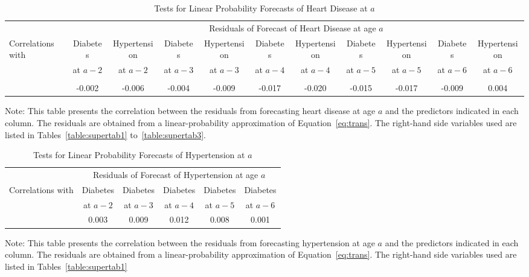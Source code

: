 \begin{landscape}
\begin{table}[H]
\begin{threeparttable}
\caption{Tests for Linear Probability Forecasts of Heart Disease at $a$} \label{table:1storderresidsheart}
\scriptsize
\centering
\begin{tabular}{lcccccccccc} \toprule
& \multicolumn{10}{c}{Residuals of Forecast of Heart Disease at age $a$} \\
Correlations with	&	Diabetes &	Hypertension &	Diabetes &	Hypertension &	Diabetes	&	Hypertension &	Diabetes & Hypertension & Diabetes & Hypertension \\
                    &	at $a - 2$ &	at $a - 2$		&	at $a - 3$ & at $a - 3$		& at $a - 4$		& at $a - 4$		& at $a - 5$	& at $a - 5$	& at $a - 6$	& at $a - 6$	\\

\midrule \\
&	-0.002	&	-0.006	&	-0.004	& -0.009 &	-0.017	& -0.020	&	-0.015	&	-0.017 &-0.009	&	0.004	\\
\bottomrule
\end{tabular}
\begin{tablenotes}
\footnotesize
\item Note: This table presents the correlation between the residuals from forecasting heart disease at age $a$ and the predictors indicated in each column. The residuals are obtained from a linear-probability approximation of Equation~\eqref{eq:trans}. The right-hand side variables used are listed in Tables~\ref{table:supertab1} to~\ref{table:supertab3}.
\end{tablenotes}
\end{threeparttable}
\end{table}

\begin{table}[H]
\begin{threeparttable}
\caption{Tests for Linear Probability Forecasts of Hypertension at $a$} \label{table:1storderresidshyper}
\centering
\scriptsize
\begin{tabular}{lccccc} \toprule
& \multicolumn{5}{c}{Residuals of Forecast of Hypertension at age $a$} \\
Correlations with	&	 Diabetes & Diabetes & Diabetes & Diabetes & Diabetes 	\\
                    & at $a - 2$	& at $a - 3$	& at $a - 4$	& at $a - 5$	& at $a - 6$	\\
\midrule
&	0.003	& 0.009	&	0.012	&	0.008	&	0.001	\\
\bottomrule
\end{tabular}
\begin{tablenotes}
\footnotesize
\item Note: This table presents the correlation between the residuals from forecasting hypertension at age $a$ and the predictors indicated in each column. The residuals are obtained from a linear-probability approximation of Equation~\eqref{eq:trans}. The right-hand side variables used are listed in Tables~\ref{table:supertab1} 
\end{tablenotes}
\end{threeparttable}
\end{table}


\end{landscape}
